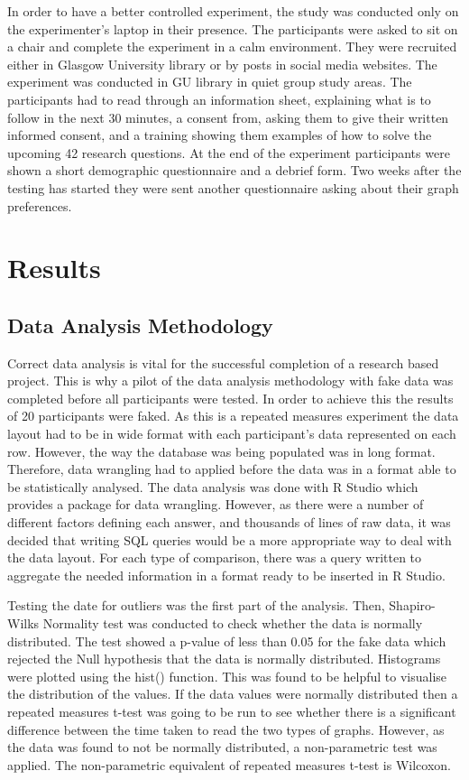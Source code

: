\documentclass{l4proj}
\begin{document}
In order to have a better controlled experiment, the study was conducted only on the experimenter's laptop in their presence. The participants were asked to sit on a chair and complete the experiment in a calm environment. They were recruited either in Glasgow University library or by posts in social media websites. The experiment was conducted in GU library in quiet group study areas. The participants had to read through an information sheet, explaining what is to follow in the next 30 minutes, a consent from, asking them to give their written informed consent, and a training showing them examples of how to solve the upcoming 42 research questions. At the end of the experiment participants were shown a short demographic questionnaire and a debrief form. Two weeks after the testing has started they were sent another questionnaire asking about their graph preferences.


\section{Results}

\subsection{Data Analysis Methodology}

Correct data analysis is vital for the successful completion of a research based project. This is why a pilot of the data analysis methodology with fake data was completed before all participants were tested. In order to achieve this the results of 20 participants were faked. As this is a repeated measures experiment the data layout had to be in wide format with each participant's data represented on each row. However, the way the database was being populated was in long format. Therefore, data wrangling had to applied before the data was in a format able to be statistically analysed. The data analysis was done with R Studio which provides a package for data wrangling. However, as there were a number of different factors defining each answer, and thousands of lines of raw data, it was decided that writing SQL queries would be a more appropriate way to deal with the data layout. For each type of comparison, there was a query written to aggregate the needed information in a format ready to be inserted in R Studio. 

Testing the date for outliers was the first part of the analysis. Then, Shapiro-Wilks Normality test was conducted to check whether the data is normally distributed. The test showed a p-value of less than 0.05 for the fake data which rejected the Null hypothesis that the data is normally distributed. Histograms were plotted using the hist() function. This was found to be helpful to visualise the distribution of the values. If the data values were normally distributed then a repeated measures t-test was going to be run to see whether there is a significant difference between the time taken to read the two types of graphs. However, as the data was found to not be normally distributed, a non-parametric test was applied. The non-parametric equivalent of repeated measures t-test is Wilcoxon. 
\end{document}
